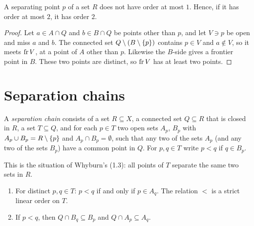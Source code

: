 
\begin{lemma}\label{lem:sep-not-order1}
A separating point $p$ of a set $R$ does not have order at most $1$. Hence, if it has order at most $2$, it has order $2$.
\end{lemma}

\begin{proof}
Let $a\in A\cap Q$ and $b\in B\cap Q$ be points other than $p$, and let $V\ni p$ be open and miss $a$ and $b$. The connected set
$Q\setminus(B\setminus\left\{ p \right\})$ contains $p\in V$ and $a\notin V$, so it meets $\operatorname{fr} V$, at a point of $A$ other than $p$. Likewise the $B$-side gives a
frontier point in $B$. These two points are distinct, so $\operatorname{fr} V$ has at least two points.
\end{proof}


\section{Separation chains}\label{sec:chains}

\begin{definition}\label{def:sepchain}
A \emph{separation chain} consists of a set $R\subseteq X$, a connected set $Q\subseteq R$ that is closed in $R$, a set $T\subseteq Q$, and for each
$p\in T$ two open sets $A_p$, $B_p$ with $A_p\cup B_p=R\setminus\left\{ p \right\}$ and $A_p\cap B_p=\emptyset$, such that any two of the sets $A_p$ (and any two of
the sets $B_p$) have a common point in $Q$. For $p,q\in T$ write $p<q$ if $q\in B_p$.
\end{definition}


This is the situation of Whyburn's (1.3): all points of $T$ separate the same two sets in $R$.

\begin{lemma}[Whyburn (1.2), (1.31)]\label{lem:chain-order}
\leavevmode
\begin{enumerate}[label=(\alph*)]
\item For distinct $p,q\in T$: $p<q$ if and only if $p\in A_q$. The relation $<$ is a strict linear order on $T$.
\item If $p<q$, then $Q\cap B_q\subseteq B_p$ and $Q\cap A_p\subseteq A_q$.
\end{enumerate}
\end{lemma}

